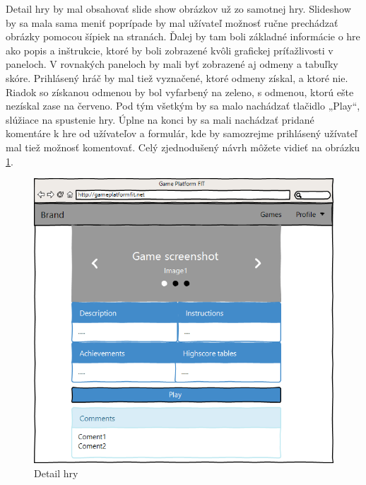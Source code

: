 Detail hry by mal obsahovať slide show obrázkov už zo samotnej hry. Slideshow by sa mala sama meniť poprípade by mal užívateľ možnosť ručne prechádzať obrázky pomocou šípiek na stranách. Ďalej by tam boli základné informácie o hre ako popis a inštrukcie, ktoré by boli zobrazené kvôli grafickej príťažlivosti v paneloch. V rovnakých paneloch by mali byť zobrazené aj odmeny a tabuľky skóre. Prihlásený hráč by mal tiež vyznačené, ktoré odmeny získal, a ktoré nie. Riadok so získanou odmenou by bol vyfarbený na zeleno, s odmenou, ktorú ešte nezískal zase na červeno. Pod tým všetkým by sa malo nachádzať tlačidlo „Play“, slúžiace na spustenie hry. Úplne na konci by sa mali nachádzať pridané komentáre k hre od užívateľov a formulár, kde by samozrejme prihlásený užívateľ mal tiež možnosť komentovať. Celý zjednodušený návrh môžete vidieť na obrázku \ref{fig:guidetailrhy}.
\begin{figure}[h]
  \centering
  \includegraphics[scale=0.35]{fig/gui-detail-hry.png}
  \caption{Detail hry}
  \label{fig:guidetailrhy}
\end{figure}

